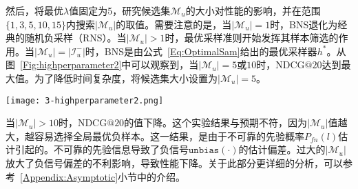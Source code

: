 然后，将最优$\lambda$值固定为5，研究候选集$\mathcal{M}_u$的大小对性能的影响，并在范围$\{1, 3, 5, 10, 15\}$内搜索$|\mathcal{M}_u|$的取值。需要注意的是，当$|\mathcal{M}_u|=1$时，BNS退化为经典的随机负采样（RNS）。当$|\mathcal{M}_u|>1$时，最优采样准则开始发挥其样本筛选的作用。当$|\mathcal{M}_u|=|\mathcal{I}_u^-|$时，BNS是由公式~\eqref{Eq:OptimalSam}给出的最优采样器$h^*$。从图~\ref{Fig:highperparameter2}中可以观察到，当$|\mathcal{M}_u|=5$或$10$时，NDCG$@20$达到最大值。为了降低时间复杂度，将候选集大小设置为$|\mathcal{M}_u|=5$。
\begin{figure*}[t!]
	\centering
	\texttt{[image: 3-highperparameter2.png]}
	\caption{候选集大小的影响}
	\label{Fig:highperparameter2}
\end{figure*}
当$|\mathcal{M}_u| > 10$时，NDCG$@20$的值下降。这个实验结果与预期不符，因为$|\mathcal{M}_u|$值越大，越容易选择全局最优负样本。这一结果，是由于不可靠的先验概率$P_{fn}(l)$估计引起的。不可靠的先验信息导致了负信号$\mathtt{unbias}(\cdot)$的估计偏差。过大的$|\mathcal{M}_u|$放大了负信号偏差的不利影响，导致性能下降。关于此部分更详细的分析，可以参考~\ref{Appendix:Asymptotic}小节中的介绍。

